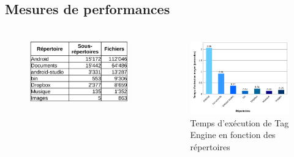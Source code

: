 \documentclass[10pt]{beamer}
\begin{document}
\subsection{Mesures de performances}
\begin{frame}
    \frametitle{\subsecname}
    \begin{columns}[T]
        \begin{column}{.35\textwidth}
            \begin{figure}
                \begin{center}
                    \includegraphics[width=1\textwidth]{images/tableau_rep.png}
                \end{center}
            \end{figure}
        \end{column}
        \begin{column}{.65\textwidth}
            \begin{figure}
                \begin{center}
                    \includegraphics[width=1\textwidth]{images/histo4.png}
                    \caption{Temps d'exécution de Tag Engine en fonction des répertoires}
                \end{center}
            \end{figure}
        \end{column}
    \end{columns}
\end{frame}
\end{document}
